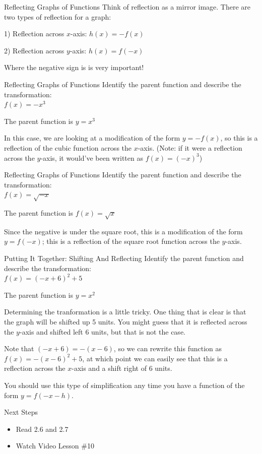 \documentclass{beamer}
\begin{document}
\begin{frame}[t]{Reflecting Graphs of Functions}
Think of reflection as a mirror image. There are two types of reflection for a graph:

\pause

1) Reflection across $x$-axis: $h(x) = -f(x)$

2) Reflection across $y$-axis: $h(x) = f(-x)$

\pause

Where the negative sign is is very important!
\end{frame}

\begin{frame}[t]{Reflecting Graphs of Functions}
Identify the parent function and describe the transformation: \\
$f(x) = -x^3$

\pause

The parent function is $y = x^3$

\pause

In this case, we are looking at a modification of the form $y = -f(x)$, so this is a reflection of the cubic function across the $x$-axis. (Note: if it were a reflection across the $y$-axis, it would've been written as $f(x) = (-x)^3$)
\end{frame}

\begin{frame}[t]{Reflecting Graphs of Functions}
Identify the parent function and describe the transformation: \\
$f(x) = \sqrt{-x}$

\pause

The parent function is $f(x) = \sqrt{x}$

Since the negative is under the square root, this is a modification of the form $y = f(-x)$; this is a reflection of the square root function across the $y$-axis.
\end{frame}

\begin{frame}[t]{Putting It Together: Shifting And Reflecting}
Identify the parent function and describe the transformation: \\
$f(x) = (-x + 6)^2 + 5$

\pause

The parent function is $y = x^2$

\pause Determining the tranformation is a little tricky. One thing that is clear is that the graph will be shifted up 5 units. You might guess that it is reflected across the $y$-axis and shifted left 6 units, but that is not the case.

\pause

Note that $(-x+6) = -(x - 6)$, so we can rewrite this function as $f(x) = -(x-6)^2 + 5$, at which point we can easily see that this is a reflection across the $x$-axis and a shift right of 6 units.

\pause

You should use this type of simplification any time you have a function of the form $y = f(-x - h)$.
\end{frame}

\begin{frame}[t]{Next Steps}
\begin{itemize}
\item Read 2.6 and 2.7
\item Watch Video Lesson \#10
\end{itemize}
\end{frame}
\end{document}
